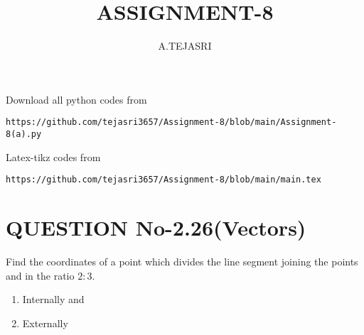 \documentclass[journal,12pt,twocolumn]{IEEEtran}
\begin{document}
     \def\rightbox#1{\makebox[0in][r]{#1}}
     \def\centbox#1{\makebox[0in]{#1}}
     \def\topbox#1{\raisebox{-\baselineskip}[0in][0in]{#1}}
     \def\midbox#1{\raisebox{-0.5\baselineskip}[0in][0in]{#1}}
\vspace{3cm}
\title{ASSIGNMENT-8}
\author{A.TEJASRI}
\maketitle
\newpage
\bigskip
\renewcommand{\thefigure}{\theenumi}
\renewcommand{\thetable}{\theenumi}
%
Download all python codes from 
\begin{lstlisting}
https://github.com/tejasri3657/Assignment-8/blob/main/Assignment-8(a).py
\end{lstlisting}
%
Latex-tikz codes from 
%
\begin{lstlisting}
https://github.com/tejasri3657/Assignment-8/blob/main/main.tex
\end{lstlisting}
%
\section{QUESTION No-2.26(Vectors)}
Find the coordinates of a point which divides the line segment joining the points  and  in the ratio $2:3$.
\begin{enumerate}
\item Internally and 
\item Externally
\end{enumerate}
\end{document}
